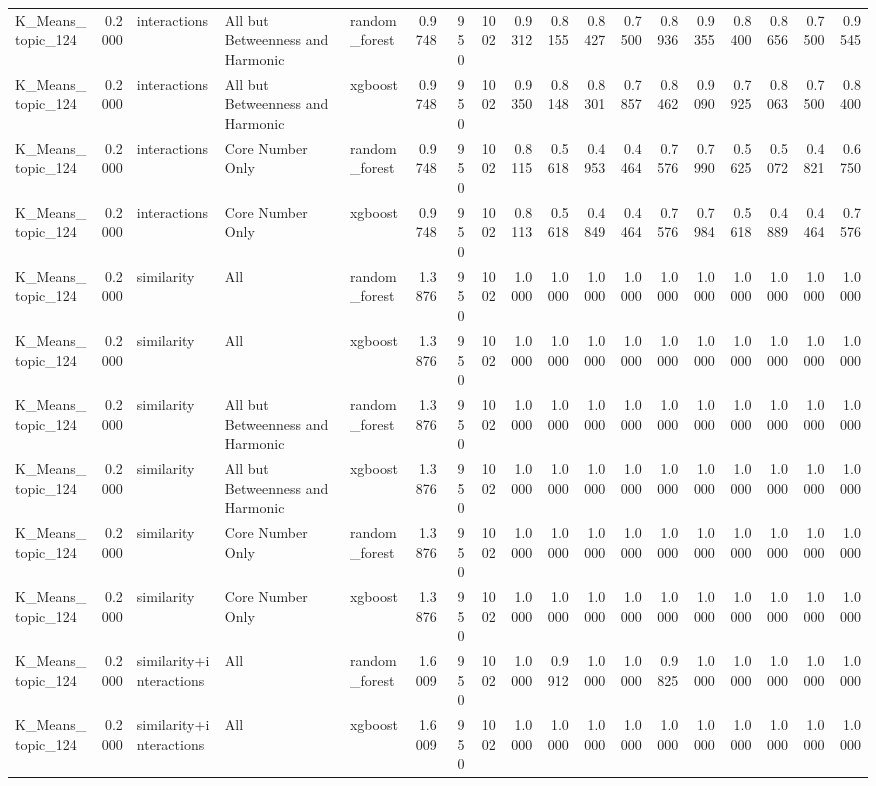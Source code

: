 \begin{tabular}{lrlllrrrrrrrrrrrrr}
K_Means_topic_124 & 0.2000 & interactions & All but Betweenness and Harmonic & random_forest & 0.9748 & 950 & 1002 & 0.9312 & 0.8155 & 0.8427 & 0.7500 & 0.8936 & 0.9355 & 0.8400 & 0.8656 & 0.7500 & 0.9545 \\
K_Means_topic_124 & 0.2000 & interactions & All but Betweenness and Harmonic & xgboost & 0.9748 & 950 & 1002 & 0.9350 & 0.8148 & 0.8301 & 0.7857 & 0.8462 & 0.9090 & 0.7925 & 0.8063 & 0.7500 & 0.8400 \\
K_Means_topic_124 & 0.2000 & interactions & Core Number Only & random_forest & 0.9748 & 950 & 1002 & 0.8115 & 0.5618 & 0.4953 & 0.4464 & 0.7576 & 0.7990 & 0.5625 & 0.5072 & 0.4821 & 0.6750 \\
K_Means_topic_124 & 0.2000 & interactions & Core Number Only & xgboost & 0.9748 & 950 & 1002 & 0.8113 & 0.5618 & 0.4849 & 0.4464 & 0.7576 & 0.7984 & 0.5618 & 0.4889 & 0.4464 & 0.7576 \\
K_Means_topic_124 & 0.2000 & similarity & All & random_forest & 1.3876 & 950 & 1002 & 1.0000 & 1.0000 & 1.0000 & 1.0000 & 1.0000 & 1.0000 & 1.0000 & 1.0000 & 1.0000 & 1.0000 \\
K_Means_topic_124 & 0.2000 & similarity & All & xgboost & 1.3876 & 950 & 1002 & 1.0000 & 1.0000 & 1.0000 & 1.0000 & 1.0000 & 1.0000 & 1.0000 & 1.0000 & 1.0000 & 1.0000 \\
K_Means_topic_124 & 0.2000 & similarity & All but Betweenness and Harmonic & random_forest & 1.3876 & 950 & 1002 & 1.0000 & 1.0000 & 1.0000 & 1.0000 & 1.0000 & 1.0000 & 1.0000 & 1.0000 & 1.0000 & 1.0000 \\
K_Means_topic_124 & 0.2000 & similarity & All but Betweenness and Harmonic & xgboost & 1.3876 & 950 & 1002 & 1.0000 & 1.0000 & 1.0000 & 1.0000 & 1.0000 & 1.0000 & 1.0000 & 1.0000 & 1.0000 & 1.0000 \\
K_Means_topic_124 & 0.2000 & similarity & Core Number Only & random_forest & 1.3876 & 950 & 1002 & 1.0000 & 1.0000 & 1.0000 & 1.0000 & 1.0000 & 1.0000 & 1.0000 & 1.0000 & 1.0000 & 1.0000 \\
K_Means_topic_124 & 0.2000 & similarity & Core Number Only & xgboost & 1.3876 & 950 & 1002 & 1.0000 & 1.0000 & 1.0000 & 1.0000 & 1.0000 & 1.0000 & 1.0000 & 1.0000 & 1.0000 & 1.0000 \\
K_Means_topic_124 & 0.2000 & similarity+interactions & All & random_forest & 1.6009 & 950 & 1002 & 1.0000 & 0.9912 & 1.0000 & 1.0000 & 0.9825 & 1.0000 & 1.0000 & 1.0000 & 1.0000 & 1.0000 \\
K_Means_topic_124 & 0.2000 & similarity+interactions & All & xgboost & 1.6009 & 950 & 1002 & 1.0000 & 1.0000 & 1.0000 & 1.0000 & 1.0000 & 1.0000 & 1.0000 & 1.0000 & 1.0000 & 1.0000 \\

\end{tabular}
